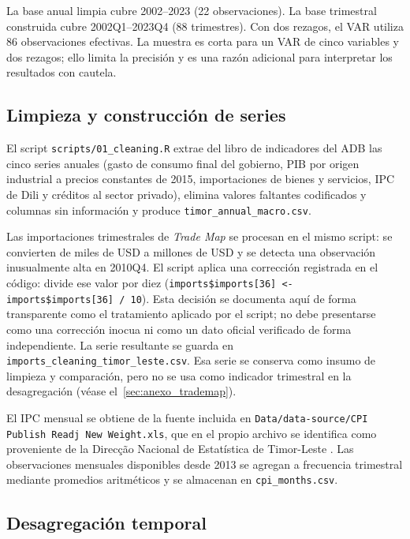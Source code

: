 \documentclass[11pt,a4paper]{article}
\begin{document}
La base anual limpia cubre 2002--2023 (22 observaciones). La base trimestral construida cubre 2002Q1--2023Q4 (88 trimestres). Con dos rezagos, el VAR utiliza 86 observaciones efectivas. La muestra es corta
para un VAR de cinco variables y dos rezagos; ello limita la precisión y es
una razón adicional para interpretar los resultados con cautela.

\subsection{Limpieza y construcción de series}
\label{sec:limpieza}

El script \texttt{scripts/01\_cleaning.R} extrae del libro de indicadores del ADB
las cinco series anuales (gasto de consumo final del gobierno, PIB por origen
industrial a precios constantes de 2015, importaciones de bienes y servicios, IPC
de Dili y créditos al sector privado), elimina valores faltantes codificados
y columnas sin información y produce \texttt{timor\_annual\_macro.csv}.

Las importaciones trimestrales de \emph{Trade Map} \parencite{trademap2025} se procesan en el mismo
script: se convierten de miles de USD a millones de USD y se detecta una
observación inusualmente alta en 2010Q4. El script aplica una
corrección registrada en el código: divide ese valor por diez
(\texttt{imports\$imports[36] <- imports\$imports[36] / 10}). Esta decisión
se documenta aquí de forma transparente como el tratamiento aplicado por el
script; no debe presentarse como una corrección inocua ni como un dato
oficial verificado de forma independiente. La serie resultante se guarda en
\texttt{imports\_cleaning\_timor\_leste.csv}. Esa serie se conserva como
insumo de limpieza y comparación, pero no se usa como indicador trimestral en
la desagregación (véase el~\ref{sec:anexo_trademap}).

El IPC mensual se obtiene de la fuente incluida en
\texttt{Data/data-source/CPI Publish Readj New Weight.xls}, que en el propio
archivo se identifica como proveniente de la Direcção Nacional de
Estatística de Timor-Leste \parencite{dne_cpi}. Las observaciones mensuales
disponibles desde 2013 se agregan a frecuencia trimestral mediante promedios
aritméticos y se almacenan en \texttt{cpi\_months.csv}.

\subsection{Desagregación temporal}
\label{sec:desagregacion}
\end{document}
